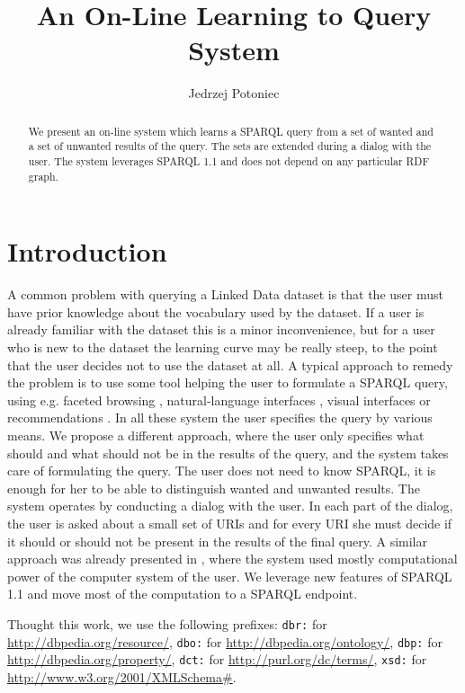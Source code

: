 \documentclass{llncs}
\title{An On-Line Learning to Query System}
\author{Jedrzej Potoniec}
\institute{Faculty of Computing, Poznan University of Technology\\ul. Piotrowo 3, 60-965 Poznan, Poland \\\email{Jedrzej.Potoniec@cs.put.poznan.pl}}
\begin{document}
\maketitle

\begin{abstract}
We present an on-line system which learns a SPARQL query from a set of wanted and a set of unwanted results of the query.
The sets are extended during a dialog with the user.
The system leverages SPARQL 1.1 and does not depend on any particular RDF graph.
\end{abstract}

\section{Introduction}

A common problem with querying a Linked Data dataset is that the user must have prior knowledge about the vocabulary used by the dataset.
If a user is already familiar with the dataset this is a minor inconvenience, but for a user who is new to the dataset the learning curve may be really steep, to the point that the user decides not to use the dataset at all.
A typical approach to remedy the problem is to use some tool helping the user to formulate a SPARQL \cite{Harris:13:SQL} query, using e.g. faceted browsing \cite{DBLP:conf/semweb/Ferre14a}, natural-language interfaces  \cite{hoffner2016survey}, visual interfaces \cite{DBLP:conf/semweb/ZainabSMZDH15} or recommendations \cite{DBLP:conf/semweb/Campinas14}.
In all these system the user specifies the query by various means.
We propose a different approach, where the user only specifies what should and what should not be in the results of the query, and the system takes care of formulating the query.
The user does not need to know SPARQL, it is enough for her to be able to distinguish wanted and unwanted results.
The system operates by conducting a dialog with the user.
In each part of the dialog, the user is asked about a small set of URIs and for every URI she must decide if it should or should not be present in the results of the final query.
A similar approach was already presented in  \cite{DBLP:conf/esws/LehmannB11}, where the system used mostly computational power of the computer system of the user.
We leverage new features of SPARQL 1.1 and move most of the computation to a SPARQL endpoint.

Thought this work, we use the following prefixes: \texttt{dbr:} for \url{http://dbpedia.org/resource/}, \texttt{dbo:} for \url{http://dbpedia.org/ontology/}, \texttt{dbp:} for \url{http://dbpedia.org/property/}, \texttt{dct:} for \url{http://purl.org/dc/terms/}, \texttt{xsd:} for \url{http://www.w3.org/2001/XMLSchema#}.
\end{document}

